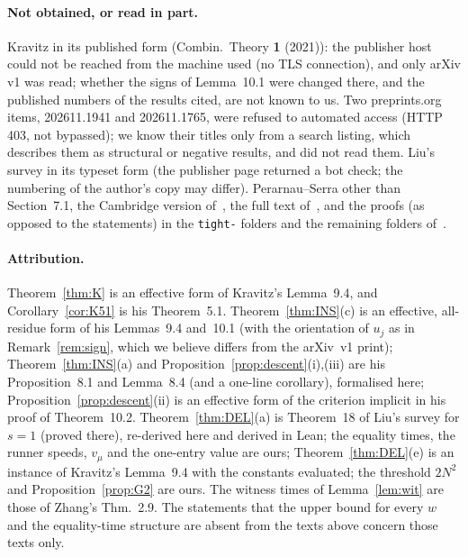 \documentclass[11pt]{article}
\theoremstyle{definition}
\theoremstyle{remark}
\begin{document}
\paragraph{Not obtained, or read in part.}
Kravitz in its published form (Combin.\ Theory \textbf{1} (2021)): the publisher host could not be reached from the machine used (no TLS connection), and only arXiv v1 was read; whether the signs of Lemma~10.1 were changed there, and the published numbers of the results cited, are not known to us. Two preprints.org items, 202611.1941 and 202611.1765, were refused to automated access (HTTP 403, not bypassed); we know their titles only from a search listing, which describes them as structural or negative results, and did not read them. Liu's survey in its typeset form (the publisher page returned a bot check; the numbering of the author's copy may differ). Perarnau--Serra other than Section~7.1, the Cambridge version of~\cite{GK}, the full text of~\cite{FS}, and the proofs (as opposed to the statements) in the \texttt{tight-} folders and the remaining folders of~\cite{R1337}.

\paragraph{Attribution.}
Theorem~\ref{thm:K} is an effective form of Kravitz's Lemma~9.4, and Corollary~\ref{cor:K51} is his Theorem~5.1. Theorem~\ref{thm:INS}(c) is an effective, all-residue form of his Lemmas~9.4 and~10.1 (with the orientation of $u_j$ as in Remark~\ref{rem:sign}, which we believe differs from the arXiv~v1 print); Theorem~\ref{thm:INS}(a) and Proposition~\ref{prop:descent}(i),(iii) are his Proposition~8.1 and Lemma~8.4 (and a one-line corollary), formalised here; Proposition~\ref{prop:descent}(ii) is an effective form of the criterion implicit in his proof of Theorem~10.2. Theorem~\ref{thm:DEL}(a) is Theorem~18 of Liu's survey for $s=1$ (proved there), re-derived here and derived in Lean; the equality times, the runner speeds, $v_\mu$ and the one-entry value are ours; Theorem~\ref{thm:DEL}(e) is an instance of Kravitz's Lemma~9.4 with the constants evaluated; the threshold $2N^2$ and Proposition~\ref{prop:G2} are ours. The witness times of Lemma~\ref{lem:wit} are those of Zhang's Thm.~2.9. The statements that the upper bound for every $w$ and the equality-time structure are absent from the texts above concern those texts only.

\appendix
\end{document}
